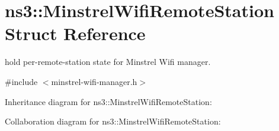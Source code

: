 \hypertarget{structns3_1_1MinstrelWifiRemoteStation}{}\section{ns3\+:\+:Minstrel\+Wifi\+Remote\+Station Struct Reference}
\label{structns3_1_1MinstrelWifiRemoteStation}


hold per-\/remote-\/station state for Minstrel Wifi manager.  




{\ttfamily \#include $<$minstrel-\/wifi-\/manager.\+h$>$}



Inheritance diagram for ns3\+:\+:Minstrel\+Wifi\+Remote\+Station\+:


Collaboration diagram for ns3\+:\+:Minstrel\+Wifi\+Remote\+Station\+:
